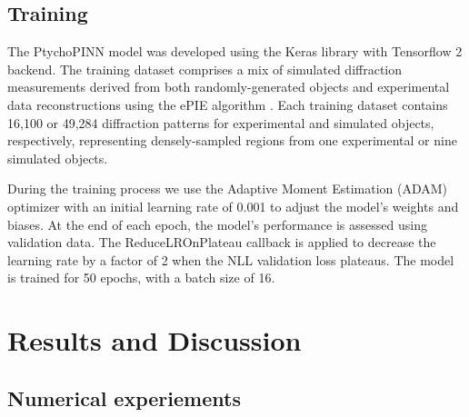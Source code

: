 \documentclass[sn-mathphys]{sn-jnl}%
\theoremstyle{thmstyleone}%
\theoremstyle{thmstyletwo}%
\theoremstyle{thmstylethree}%
\begin{document}
\subsection{Training}
The PtychoPINN model was developed using the Keras library with Tensorflow 2 backend. The training dataset comprises a mix of simulated diffraction measurements derived from both randomly-generated objects and experimental data reconstructions using the ePIE algorithm \cite{cherukara2020ai}. Each training dataset contains 16,100 or 49,284 diffraction patterns for experimental and simulated objects, respectively, representing densely-sampled regions from one experimental or nine simulated objects.

During the training process we use the Adaptive Moment Estimation (ADAM) optimizer with an initial learning rate of 0.001 to adjust the model's weights and biases. At the end of each epoch, the model's performance is assessed using validation data. The ReduceLROnPlateau callback is applied to decrease the learning rate by a factor of 2 when the NLL validation loss plateaus. The model is trained for 50 epochs, with a batch size of 16.




\section{Results and Discussion}

\subsection{Numerical experiements}
\end{document}
